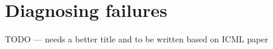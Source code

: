 \chapter{Diagnosing failures}\label{section:post_mortem}

TODO --- needs a better title and to be written based on ICML paper